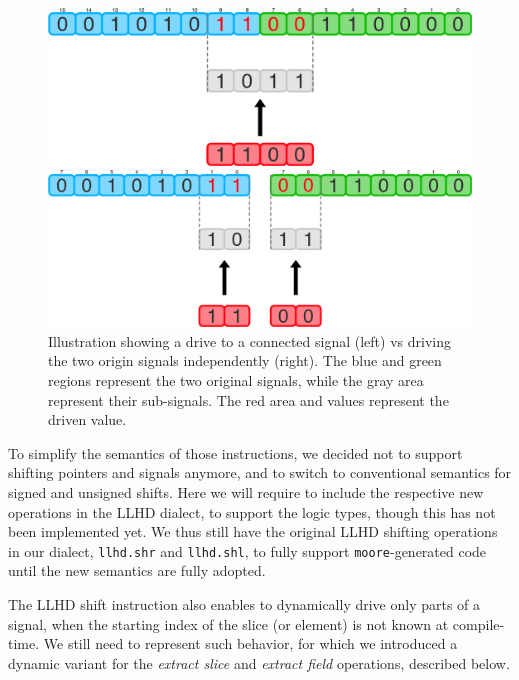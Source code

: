 \begin{figure}[ht]
    \centering
    \begin{minipage}{0.49\textwidth}
        \includegraphics[width=\textwidth]{gfx/DrvConn.png}
    \end{minipage}
    \hfill
    \begin{minipage}{0.49\textwidth}
        \includegraphics[width=\textwidth]{gfx/DrvSplit.png}
    \end{minipage}
    \caption[Driving a connected signal vs. driving the two origin signals independently.]{Illustration showing a drive to a connected signal (left) vs driving the two origin signals independently (right). The blue and green regions represent the two original signals, while the gray area represent their sub-signals. The red area and values represent the driven value.}
    \label{fig:drvconn}
\end{figure}

To simplify the semantics of those instructions, we decided not to support shifting pointers and signals anymore, and to switch to conventional semantics for signed and unsigned shifts. Here we will require to include the respective new operations in the LLHD dialect, to support the logic types, though this has not been implemented yet. We thus still have the original LLHD shifting operations in our dialect, \texttt{llhd.shr} and \texttt{llhd.shl}, to fully support \texttt{moore}-generated code until the new semantics are fully adopted.

The LLHD shift instruction also enables to dynamically drive only parts of a signal, when the starting index of the slice (or element) is not known at compile-time. We still need to represent such behavior, for which we introduced a dynamic variant for the \textit{extract slice} and \textit{extract field} operations, described below.

